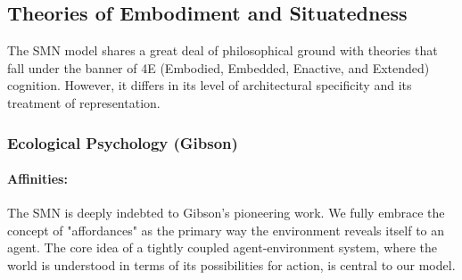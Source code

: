 \subsection{Theories of Embodiment and Situatedness}\label{subsec:comparison_embodiment}
The SMN model shares a great deal of philosophical ground with theories that fall under the banner of 4E (Embodied, Embedded, Enactive, and Extended) cognition. However, it differs in its level of architectural specificity and its treatment of representation.  \subsubsection{Ecological Psychology (Gibson)}\label{ssubsec:ecological}\paragraph{Affinities:} The SMN is deeply indebted to Gibson's pioneering work. We fully embrace the concept of "affordances" as the primary way the environment reveals itself to an agent. The core idea of a tightly coupled agent-environment system, where the world is understood in terms of its possibilities for action, is central to our model.
